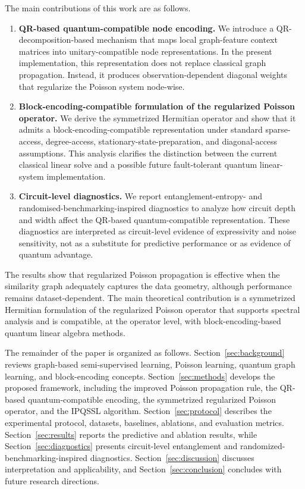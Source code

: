 \documentclass[11pt,a4paper]{article}
\begin{document}
The main contributions of this work are as follows.

\begin{enumerate}

    \item \textbf{QR-based quantum-compatible node encoding.}
    We introduce a QR-decomposition-based mechanism that maps local graph-feature context matrices into unitary-compatible node representations. In the present implementation, this representation does not replace classical graph propagation. Instead, it produces observation-dependent diagonal weights that regularize the Poisson system node-wise.

    \item \textbf{Block-encoding-compatible formulation of the regularized Poisson operator.}
    We derive the symmetrized Hermitian operator and show that it admits a block-encoding-compatible representation under standard sparse-access, degree-access, stationary-state-preparation, and diagonal-access assumptions. This analysis clarifies the distinction between the current classical linear solve and a possible future fault-tolerant quantum linear-system implementation.

    \item \textbf{Circuit-level diagnostics.}
    We report entanglement-entropy- and randomised-benchmarking-inspired diagnostics to analyze how circuit depth and width affect the QR-based quantum-compatible representation. These diagnostics are interpreted as circuit-level evidence of expressivity and noise sensitivity, not as a substitute for predictive performance or as evidence of quantum advantage.
\end{enumerate}

The results show that regularized Poisson propagation is effective when the similarity graph adequately captures the data geometry, although performance remains dataset-dependent. The main theoretical contribution is a symmetrized Hermitian formulation of the regularized Poisson operator that supports spectral analysis and is compatible, at the operator level, with block-encoding-based quantum linear algebra methods.

The remainder of the paper is organized as follows.
Section~\ref{sec:background} reviews graph-based semi-supervised learning,
Poisson learning, quantum graph learning, and block-encoding concepts.
Section~\ref{sec:methods} develops the proposed framework, including the
improved Poisson propagation rule, the QR-based quantum-compatible
encoding, the symmetrized regularized Poisson operator, and the IPQSSL
algorithm. Section~\ref{sec:protocol} describes the experimental protocol,
datasets, baselines, ablations, and evaluation metrics. Section~\ref{sec:results}
reports the predictive and ablation results, while Section~\ref{sec:diagnostics}
presents circuit-level entanglement and randomized-benchmarking-inspired
diagnostics. Section~\ref{sec:discussion} discusses interpretation and
applicability, and Section~\ref{sec:conclusion} concludes with future research directions.
\end{document}
